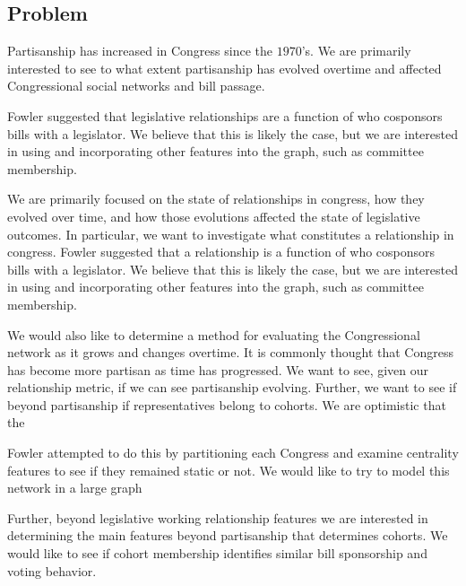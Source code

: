 \subsection{Problem}

Partisanship has increased in Congress since the $1970$'s. We are primarily 
interested to see to what extent partisanship has evolved overtime and affected 
Congressional social networks and bill passage.

Fowler suggested that legislative relationships are a function  of who
cosponsors bills with a legislator. We believe that this is likely the  case,
but we are interested in using and incorporating other features into  the graph,
such as committee membership. 

We are primarily focused on the state of relationships in congress, how 
they evolved over time, and how those evolutions affected the state of 
legislative outcomes. In particular, we want to investigate what constitutes a 
relationship in congress. Fowler suggested that a relationship is a function 
of who cosponsors bills with a legislator. We believe that this is likely the 
case, but we are interested in using and incorporating other features into 
the graph, such as committee membership. 

We would also like to determine a method for evaluating the Congressional
network as it grows and changes overtime. It is commonly thought that Congress
has become more partisan as time has progressed. We want to see, given our
relationship metric, if we can see partisanship evolving. Further, we want to
see if beyond partisanship if representatives belong to cohorts. We are 
optimistic that the

Fowler attempted to do this by  partitioning each Congress and examine
centrality features to see if they  remained static or not. We would like to try
to model this network in a  large graph

Further, beyond legislative working relationship features we are interested in 
determining the main features beyond partisanship that determines cohorts. We 
would like to see if cohort membership identifies similar bill sponsorship and 
voting behavior.
